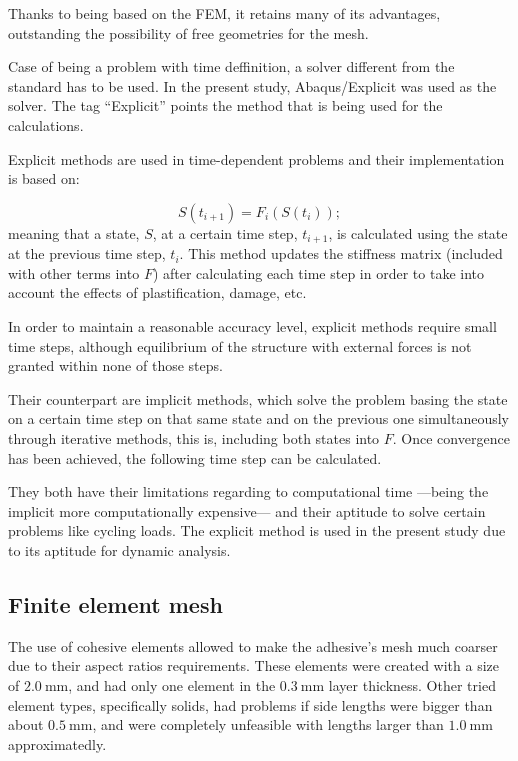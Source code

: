 \documentclass[cmfonts]{witpress}
\begin{document}
Thanks to being based on the FEM, it retains many of its advantages, outstanding the possibility of free geometries for the mesh.

Case of being a problem with time deffinition, a solver different from the standard has to be used. In the present study, Abaqus/Explicit was used as the solver. The tag ``Explicit'' points the method that is being used for the calculations.

Explicit methods are used in time-dependent problems and their implementation is based on:

\begin{equation}
S\left(t_{i+1}\right) = F_{i}\left(S\left(t_{i}\right)\right) ;
\label{eq:explicit}
\end{equation}
meaning that a state, $S$, at a certain time step, $t_{i+1}$, is calculated using the state at the previous time step, $t_{i}$. This method updates the stiffness matrix (included with other terms into $F$) after calculating each time step in order to take into account the effects of plastification, damage, etc.

In order to maintain a reasonable accuracy level, explicit methods require small time steps, although equilibrium of the structure with external forces is not granted within none of those steps.

Their counterpart are implicit methods, which solve the problem basing the state on a certain time step on that same state and on the previous one simultaneously through iterative methods, this is, including both states into $F$. Once convergence has been achieved, the following time step can be calculated.

They both have their limitations regarding to computational time ---being the implicit more computationally expensive--- and their aptitude to solve certain problems like cycling loads. The explicit method is used in the present study due to its aptitude for dynamic analysis.

\subsection{Finite element mesh}

The use of cohesive elements allowed to make the adhesive's mesh much coarser due to their aspect ratios requirements. These elements were created with a size of $\SI{2.0}{\mm}$, and had only one element in the $\SI{0.3}{\mm}$ layer thickness. Other tried element types, specifically solids, had problems if side lengths were bigger than about $\SI{0.5}{\mm}$, and were completely unfeasible with lengths larger than $\SI{1.0}{\mm}$ approximatedly.
\end{document}
